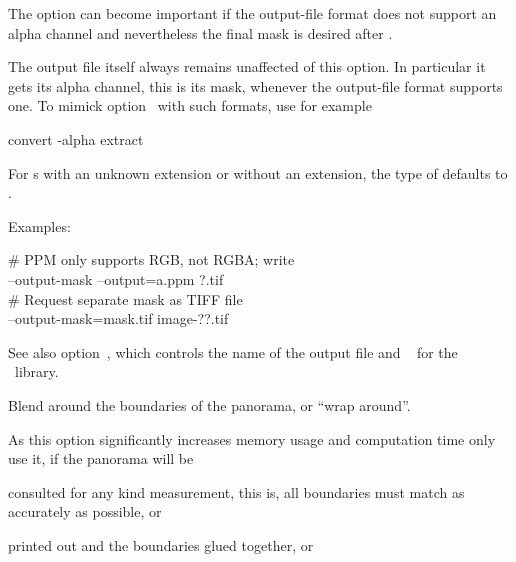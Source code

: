 \begin{codelist}
  The option can become important if the output-file format does not support an alpha channel
  and nevertheless the final mask is desired after \appisdoing.

  The output file itself always remains unaffected of this option.  In particular it gets its
  alpha channel, this is its mask, whenever the output-file format supports one.  To mimick
  option~ with such formats, use for example

  \begin{literal}
    convert  -alpha extract 
  \end{literal}

  For s with an unknown extension or without an extension, the type of
   defaults to .

  Examples:

  \begin{literal}
    \# PPM only supports RGB, not RGBA; write  \\
    \app{} --output-mask --output=a.ppm ?.tif \\
    \# Request separate mask as TIFF file \\
    \app{} --output-mask=mask.tif image-??.tif
  \end{literal}

  See also option~, which controls the name of the
  output file and \sectionName~ for the ~library.


  \label{opt:wrap}%
\item[\itempar{-w \optional{\metavar{MODE}} \\ --wrap\optional{=\metavar{MODE}}}]\itemend
  Blend around the boundaries of the panorama, or ``wrap around''.

  As this option significantly increases memory usage and computation time only use it, if the
  panorama will be

  \begin{compactitemize}
  \item
    consulted for any kind measurement, this is, all boundaries must match as accurately as
    possible, or

  \item
    printed out and the boundaries glued together, or


\end{compactitemize}
\end{codelist}
